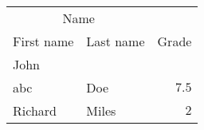 \documentclass[utf8]{ctexart}
\begin{document}
\begin{tabular}{llr}
\toprule
\multicolumn{2}{c}{Name} \\
\cmidrule(r){1-2}
First name & Last name & Grade \\
\midrule
John\\abc & Doe & $7.5$ \\
Richard & Miles & $2$\\
\bottomrule
\end{tabular}
\end{document}

